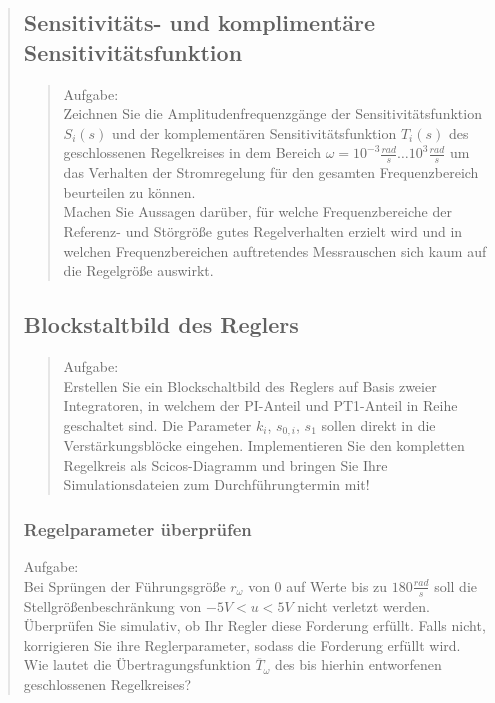 \begin{quote}
\begin{quote}
	 	
    \end{quote}    
    
    
    
    \subsection{Sensitivitäts- und komplimentäre Sensitivitätsfunktion}
    \begin{quote}
        Aufgabe:\\
        Zeichnen Sie die Amplitudenfrequenzgänge der Sensitivitätsfunktion $S_i(s)$ und der komplementären
        Sensitivitätsfunktion $T_i (s)$ des geschlossenen Regelkreises in dem Bereich $\omega = 10^{-3}\frac{rad}{s}
        \ldots 10^{3}\frac{rad}{s}$ um das Verhalten der Stromregelung für den gesamten Frequenzbereich beurteilen zu
        können.\\
        Machen Sie Aussagen darüber, für welche Frequenzbereiche der Referenz- und Störgröße gutes Regelverhalten
        erzielt wird und in welchen Frequenzbereichen auftretendes Messrauschen sich kaum auf die Regelgröße auswirkt.\\
        
                        
	\end{quote}
		
	\subsection{Blockstaltbild des Reglers}
    \begin{quote}
        Aufgabe:\\
        Erstellen Sie ein Blockschaltbild des Reglers auf Basis zweier Integratoren, in welchem der PI-Anteil und PT1-Anteil in Reihe geschaltet
        sind. Die Parameter $k_i$, $s_{0,i}$, $s_1$ sollen direkt in die Verstärkungsblöcke eingehen. Implementieren Sie
        den kompletten Regelkreis als Scicos-Diagramm und bringen Sie Ihre Simulationsdateien zum Durchführungtermin
        mit!
        
	 	
    \end{quote}
    
    \subsubsection{Regelparameter überprüfen}
        Aufgabe:\\
        Bei Sprüngen der Führungsgröße $r_\omega$ von $0$ auf Werte bis zu $180 \frac{rad}{s}$ soll die
        Stellgrößenbeschränkung von $−5V < u < 5V$ nicht verletzt werden. Überprüfen Sie simulativ, ob Ihr Regler
        diese Forderung erfüllt. Falls nicht, korrigieren Sie ihre Reglerparameter, sodass die Forderung erfüllt wird.
        Wie lautet die Übertragungsfunktion $\overline{T}_\omega$ des bis hierhin entworfenen geschlossenen
        Regelkreises?
        \begin{quote}
            

\end{quote}
\end{quote}
